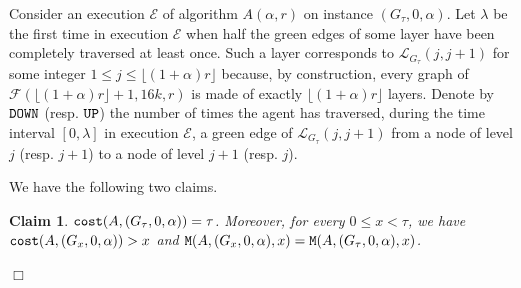 \documentclass[11pt]{article}
\newtheorem{claim}{Claim}[section]
\newcommand{\qed}{\hfill $\Box$ \bigbreak}
\newenvironment{proof}{\noindent {\bf Proof.}}{\qed}
\begin{document}
{\begin{proof}

Consider an execution $\mathcal{E}$ of algorithm $A(\alpha,r)$ on instance $(G_{\tau},0,\alpha)$. Let $\lambda$ be the first time in execution $\mathcal{E}$ when half the green edges of some layer have been completely traversed at least once. Such a layer corresponds to $\mathcal{L}_{G_{\tau}}(j,j+1)$ for some integer $1\leq j\leq \lfloor(1+\alpha)r\rfloor$ because, by construction, every graph of $\mathcal{F}(\lfloor(1+\alpha)r\rfloor+1,16k,r)$ is made of exactly $\lfloor(1+\alpha)r\rfloor$ layers. Denote by ${\tt DOWN}$ (resp. ${\tt UP}$) the number of times the agent has traversed, during the time interval $[0,\lambda]$ in execution $\mathcal{E}$, a green edge of $\mathcal{L}_{G_{\tau}}(j,j+1)$ from a node of level $j$ (resp. $j+1$) to a node of level $j+1$ (resp. $j$).

We have the following two claims.

\begin{claim}
\label{theo1:claim0}
${\tt cost}(A,(G_{\tau},0,\alpha))=\tau$. Moreover, for every $0\leq x<\tau$, we have ${\tt cost}(A,(G_x,0,\alpha))>x$ and ${\tt M}(A,(G_x,0,\alpha),x)={\tt M}(A,(G_\tau,0,\alpha),x)$.
\end{claim}


\end{proof}}
\end{document}
